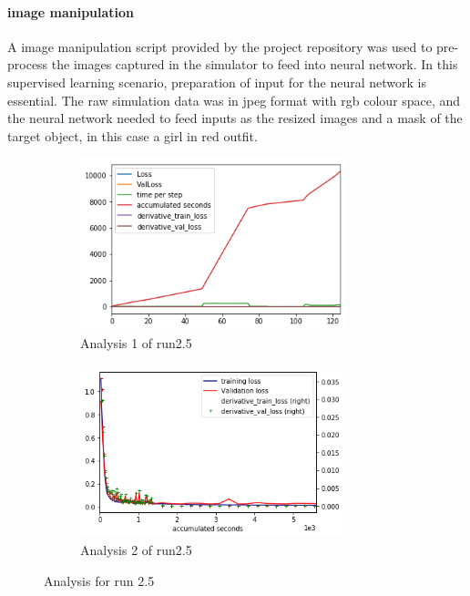 \documentclass[paper=a4, fontsize=11pt]{scrartcl} %
\numberwithin{equation}{section} %
\numberwithin{figure}{section} %
\numberwithin{table}{section} %
\begin{document}
 \paragraph{image manipulation}\label{rubric40}
A image manipulation script provided by the project repository was used to pre-process the images captured in the simulator to feed into neural network. In this supervised learning scenario, preparation of input for the neural network is essential. The raw simulation data was in jpeg format with rgb colour space, and the neural network needed to feed inputs as the resized images and a mask of the target object, in this case a girl in red outfit.
\begin{figure}	
	\begin{subfigure}{0.45\textwidth}
	\includegraphics[width=0.9\linewidth, height=5cm]{./imgs/analysis_0_2_5.png} 
	\caption{Analysis 1 of run2.5}
	\label{fig:subAnalysisRun25}
	\end{subfigure}
	\begin{subfigure}{0.45\textwidth}
	\includegraphics[width=0.9\linewidth, height=5cm]{./imgs/analysis_0_2_5plot.png}
	\caption{Analysis 2 of run2.5}
	\label{fig:subAnalysisRun25plot}
	\end{subfigure}
	 
	\caption{Analysis for run 2.5}
	\label{fig:AnalysisRun25}
 \end{figure}
 
\end{document}
